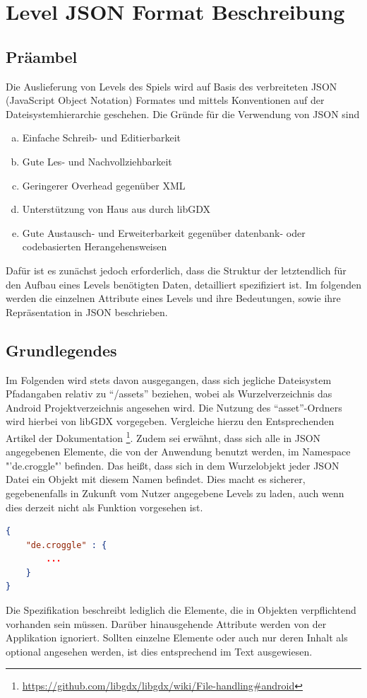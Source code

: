 \chapter{Level JSON Format Beschreibung}

\section{Präambel}
Die Auslieferung von Levels des Spiels wird auf Basis des verbreiteten JSON (JavaScript Object Notation) Formates und mittels Konventionen auf der Dateisystemhierarchie geschehen.
Die Gründe für die Verwendung von JSON sind
\begin{enumerate}[a)]
	\item Einfache Schreib- und Editierbarkeit
	\item Gute Les- und Nachvollziehbarkeit
	\item Geringerer Overhead gegenüber XML
	\item Unterstützung von Haus aus durch libGDX
	\item Gute Austausch- und Erweiterbarkeit gegenüber datenbank- oder codebasierten Herangehensweisen
\end{enumerate}
Dafür ist es zunächst jedoch erforderlich, dass die Struktur der letztendlich für den Aufbau eines Levels benötigten Daten, detailliert spezifiziert ist.
Im folgenden werden die einzelnen Attribute eines Levels und ihre Bedeutungen, sowie ihre Repräsentation in JSON beschrieben.

\section{Grundlegendes}
Im Folgenden wird stets davon ausgegangen, dass sich jegliche Dateisystem Pfadangaben relativ zu "`/assets"' beziehen, wobei als Wurzelverzeichnis das Android Projektverzeichnis angesehen wird.
Die Nutzung des "`asset"'-Ordners wird hierbei von libGDX vorgegeben.
Vergleiche hierzu den Entsprechenden Artikel der Dokumentation \footnote{\url{https://github.com/libgdx/libgdx/wiki/File-handling\#android}}.
Zudem sei erwähnt, dass sich alle in JSON angegebenen Elemente, die von der Anwendung benutzt werden, im Namespace "'de.croggle"' befinden.
Das heißt, dass sich in dem Wurzelobjekt jeder JSON Datei ein Objekt mit diesem Namen befindet.
Dies macht es sicherer, gegebenenfalls in Zukunft vom Nutzer angegebene Levels zu laden, auch wenn dies derzeit nicht als Funktion vorgesehen ist.
\begin{lstlisting}[language=json,caption={Standardinhalt jeder JSON Datei der Anwendung}]
{
	"de.croggle" : {
		...
	}
}
\end{lstlisting}
Die Spezifikation beschreibt lediglich die Elemente, die in Objekten verpflichtend vorhanden sein müssen.
Darüber hinausgehende Attribute werden von der Applikation ignoriert.
Sollten einzelne Elemente oder auch nur deren Inhalt als optional angesehen werden, ist dies entsprechend im Text ausgewiesen.

